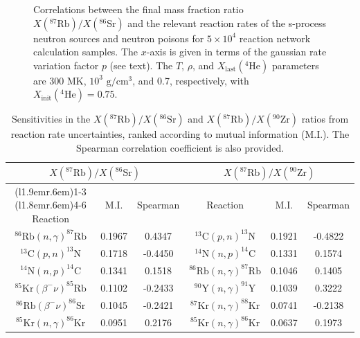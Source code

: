 \begin{figure}[t]
\begin{subfigure}[b]{0.495\textwidth}
\end{subfigure}
\caption{\label{fig:Correlations_neutron_source}Correlations between the final mass fraction ratio $X(^{87}\mathrm{Rb})/X(^{86}\mathrm{Sr})$ and the relevant reaction rates of the s-process neutron sources and neutron poisons for $5 \times 10^{4}$ reaction network calculation samples. The $x$-axis is given in terms of the gaussian rate variation factor $p$ (see text). The $T$, $\rho$, and $X_{\mathrm{last}}(^{4}\mathrm{He})$ parameters are 300 MK, $10^{3}$ $\mathrm{g}/\mathrm{cm}^{3}$, and 0.7, respectively, with $X_{\mathrm{init}}(^{4}\mathrm{He}) = 0.75$.} 
\end{figure}
       
\begin{table}[t]
\centering
\caption{\label{tab:mutual_info}Sensitivities in the $X(^{87}\mathrm{Rb})/X(^{86}\mathrm{Sr})$ and $X(^{87}\mathrm{Rb})/X(^{90}\mathrm{Zr})$ ratios from reaction rate uncertainties, ranked according to mutual information (M.I.). The Spearman correlation coefficient is also provided.}
\begin{tabular}{cccccc}
\hline\midrule
\multicolumn{3}{c}{$X(^{87}\mathrm{Rb})/X(^{86}\mathrm{Sr})$}&
\multicolumn{3}{c}{$X(^{87}\mathrm{Rb})/X(^{90}\mathrm{Zr})$}\\
\cmidrule[0.1pt](l{1.9em}r{.6em}){1-3} \cmidrule[0.1pt](l{1.8em}r{.6em}){4-6}
Reaction&M.I.&Spearman&Reaction&M.I.&Spearman\\ \midrule
$^{86}\mathrm{Rb}(n,\gamma)^{87}\mathrm{Rb}$&0.1967&0.4347
&$^{13}\mathrm{C}(p,n)^{13}\mathrm{N}$&0.1921&-0.4822\\
$^{13}\mathrm{C}(p,n)^{13}\mathrm{N}$&0.1718&-0.4450
&$^{14}\mathrm{N}(n,p)^{14}\mathrm{C}$&0.1331&0.1574\\
$^{14}\mathrm{N}(n,p)^{14}\mathrm{C}$&0.1341&0.1518
&$^{86}\mathrm{Rb}(n,\gamma)^{87}\mathrm{Rb}$&0.1046&0.1405\\
$^{85}\mathrm{Kr}(\beta^{-}\nu)^{85}\mathrm{Rb}$&0.1102&-0.2433
&$^{90}\mathrm{Y}(n,\gamma)^{91}\mathrm{Y}$&0.1039&0.3222\\
$^{86}\mathrm{Rb}(\beta^{-}\nu)^{86}\mathrm{Sr}$&0.1045&-0.2421
&$^{87}\mathrm{Kr}(n,\gamma)^{88}\mathrm{Kr}$&0.0741&-0.2138\\
$^{85}\mathrm{Kr}(n,\gamma)^{86}\mathrm{Kr}$&0.0951&0.2176
&$^{85}\mathrm{Kr}(n,\gamma)^{86}\mathrm{Kr}$&0.0637&0.1973\\
\hline\hline
\end{tabular}
\end{table}

